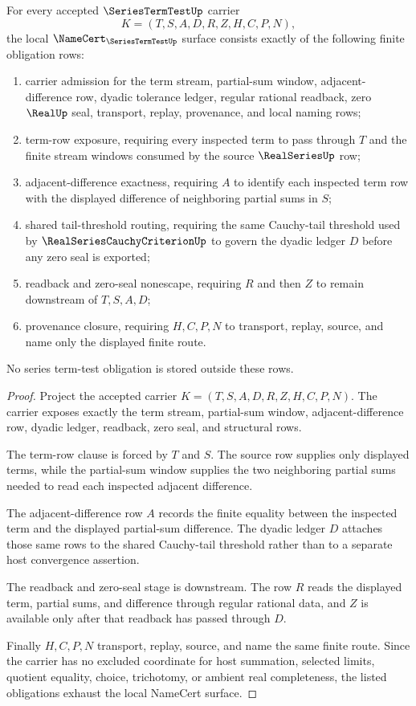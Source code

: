 \begin{theorem}
\label{thm:series-term-test-namecert-obligations}
For every accepted $\SeriesTermTestUp$ carrier
$$
K=(T,S,A,D,R,Z,H,C,P,N),
$$
the local $\NameCert_{\SeriesTermTestUp}$ surface consists exactly of the following finite obligation rows:
\begin{enumerate}
\item carrier admission for the term stream, partial-sum window, adjacent-difference row, dyadic tolerance ledger, regular rational readback, zero $\RealUp$ seal, transport, replay, provenance, and local naming rows;
\item term-row exposure, requiring every inspected term to pass through $T$ and the finite stream windows consumed by the source $\RealSeriesUp$ row;
\item adjacent-difference exactness, requiring $A$ to identify each inspected term row with the displayed difference of neighboring partial sums in $S$;
\item shared tail-threshold routing, requiring the same Cauchy-tail threshold used by $\RealSeriesCauchyCriterionUp$ to govern the dyadic ledger $D$ before any zero seal is exported;
\item readback and zero-seal nonescape, requiring $R$ and then $Z$ to remain downstream of $T,S,A,D$;
\item provenance closure, requiring $H,C,P,N$ to transport, replay, source, and name only the displayed finite route.
\end{enumerate}
No series term-test obligation is stored outside these rows.
\end{theorem}

\begin{proof}
Project the accepted carrier $K=(T,S,A,D,R,Z,H,C,P,N)$. The carrier exposes exactly the term stream, partial-sum window, adjacent-difference row, dyadic ledger, readback, zero seal, and structural rows.

The term-row clause is forced by $T$ and $S$. The source row supplies only displayed terms, while the partial-sum window supplies the two neighboring partial sums needed to read each inspected adjacent difference.

The adjacent-difference row $A$ records the finite equality between the inspected term and the displayed partial-sum difference. The dyadic ledger $D$ attaches those same rows to the shared Cauchy-tail threshold rather than to a separate host convergence assertion.

The readback and zero-seal stage is downstream. The row $R$ reads the displayed term, partial sums, and difference through regular rational data, and $Z$ is available only after that readback has passed through $D$.

Finally $H,C,P,N$ transport, replay, source, and name the same finite route. Since the carrier has no excluded coordinate for host summation, selected limits, quotient equality, choice, trichotomy, or ambient real completeness, the listed obligations exhaust the local NameCert surface.
\end{proof}

